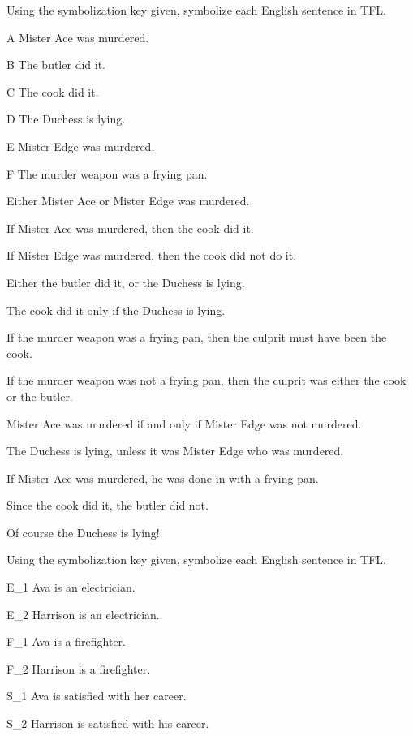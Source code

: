 \problempart Using the symbolization key given, symbolize each English sentence in TFL.
\begin{ekey}
\item[A] Mister Ace was murdered.
\item[B] The butler did it.
\item[C] The cook did it.
\item[D] The Duchess is lying.
\item[E] Mister Edge was murdered.
\item[F] The murder weapon was a frying pan.
\end{ekey}
\begin{earg}
\item Either Mister Ace or Mister Edge was murdered.
\item If Mister Ace was murdered, then the cook did it.
\item If Mister Edge was murdered, then the cook did not do it.
\item Either the butler did it, or the Duchess is lying.
\item The cook did it only if the Duchess is lying.
\item If the murder weapon was a frying pan, then the culprit must have been the cook.
\item If the murder weapon was not a frying pan, then the culprit was either the cook or the butler.
\item Mister Ace was murdered if and only if Mister Edge was not murdered.
\item The Duchess is lying, unless it was Mister Edge who was murdered.
\item If Mister Ace was murdered, he was done in with a frying pan.
\item Since the cook did it, the butler did not.
\item Of course the Duchess is lying!
\end{earg}
\problempart Using the symbolization key given, symbolize each English sentence in TFL.\label{pr.avacareer}
	\begin{ekey}
		\item[E_1] Ava is an electrician.
		\item[E_2] Harrison is an electrician.
		\item[F_1] Ava is a firefighter.
		\item[F_2] Harrison is a firefighter.
		\item[S_1] Ava is satisfied with her career.
		\item[S_2] Harrison is satisfied with his career.
	\end{ekey}

